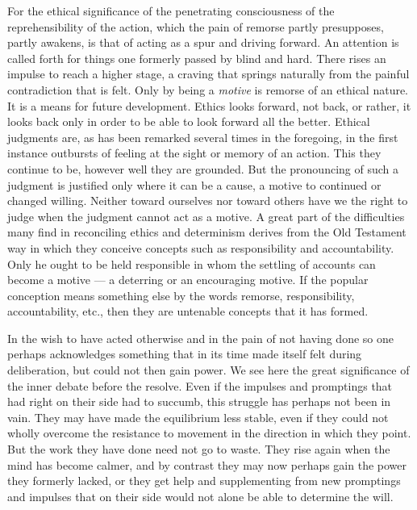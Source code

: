 \documentclass[12pt,a4paper,openany]{book}
\newcommand{\opage}[1]{\marginnote{\footnotesize\textit{[#1]}}}
\begin{document}
\opage{122}For the ethical significance of the penetrating consciousness of the reprehensibility of the action,
which the pain of remorse partly presupposes, partly awakens, is that of acting as a spur and driving
forward. An attention is called forth for things one formerly passed by blind and hard. There rises an
impulse to reach a higher stage, a craving that springs naturally from the painful contradiction that is
felt. Only by being a \textit{motive} is remorse of an ethical nature. It is a means for future
development. Ethics looks forward, not back, or rather, it looks back only in order to be able to look
forward all the better. Ethical judgments are, as has been remarked several times in the foregoing, in the
first instance outbursts of feeling at the sight or memory of an action. This they continue to be, however
well they are grounded. But the pronouncing of such a judgment is justified only where it can be a cause,
a motive to continued or changed willing. Neither toward ourselves nor toward others have we the right to
judge when the judgment cannot act as a motive. A great part of the difficulties many find in reconciling
ethics and determinism derives from the Old Testament way in which they conceive concepts such as
responsibility and accountability. Only he ought to be held responsible in whom the settling of accounts
can become a motive --- a deterring or an encouraging motive. If the popular conception means something
else by the words remorse, responsibility, accountability, etc., then they are untenable concepts that it
has formed.

In the wish to have acted otherwise and in the pain of not having done so one perhaps acknowledges
something that in its time made itself felt during deliberation, but could not then gain power. We see
here the great significance of the inner debate before the resolve. Even if the impulses and promptings
that had right on their side had to succumb, this struggle has perhaps not been in vain. They may have
made the equilibrium less stable, even if they could not wholly
\opage{123}overcome the resistance to movement in the direction in which they point. But the work they have done
need not go to waste. They rise again when the mind has become calmer, and by contrast they may now perhaps
gain the power they formerly lacked, or they get help and supplementing from new promptings and impulses
that on their side would not alone be able to determine the will.
\end{document}
